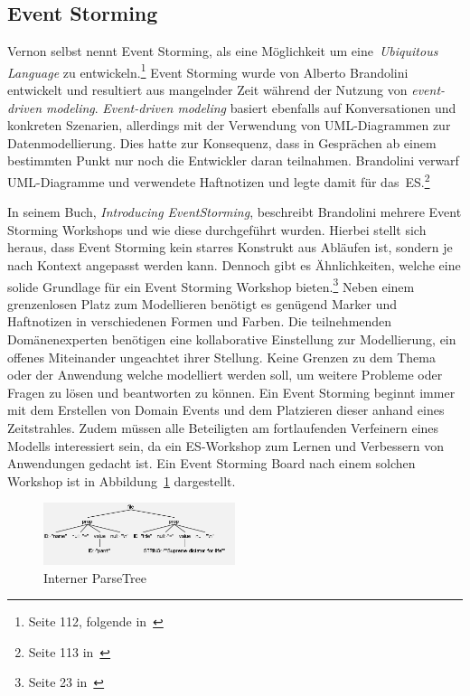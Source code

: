 \subsection{Event Storming}\label{subsec:allgemein}
Vernon selbst nennt Event Storming, als eine Möglichkeit um eine~\textit{Ubiquitous Language} zu entwickeln.\footnote{Seite 112, folgende in~\cite*{dddd}}
Event Storming wurde von Alberto Brandolini entwickelt und resultiert aus mangelnder Zeit während der Nutzung von \textit{event-driven modeling}.
\textit{Event-driven modeling} basiert ebenfalls auf Konversationen und konkreten Szenarien, allerdings mit der Verwendung von UML-Diagrammen zur Datenmodellierung.
Dies hatte zur Konsequenz, dass in Gesprächen ab einem bestimmten Punkt nur noch die Entwickler daran teilnahmen.
Brandolini verwarf UML-Diagramme und verwendete Haftnotizen und legte damit für das~\ac{ES}.\footnote{Seite 113 in~\cite*{dddd}}

In seinem Buch, \textit{Introducing EventStorming}, beschreibt Brandolini mehrere Event Storming Workshops und wie diese durchgeführt wurden.\cite*{introES}
Hierbei stellt sich heraus, dass Event Storming kein starres Konstrukt aus Abläufen ist, sondern je nach Kontext angepasst werden kann.
Dennoch gibt es Ähnlichkeiten, welche eine solide Grundlage für ein Event Storming Workshop bieten.\footnote{Seite 23 in~\cite*{introES}}
Neben einem grenzenlosen Platz zum Modellieren benötigt es genügend Marker und Haftnotizen in verschiedenen Formen und Farben.
Die teilnehmenden Domänenexperten benötigen eine kollaborative Einstellung zur Modellierung, ein offenes Miteinander ungeachtet ihrer Stellung.
Keine Grenzen zu dem Thema oder der Anwendung welche modelliert werden soll, um weitere Probleme oder Fragen zu lösen und beantworten zu können.
Ein Event Storming beginnt immer mit dem Erstellen von Domain Events und dem Platzieren dieser anhand eines Zeitstrahles.
Zudem müssen alle Beteiligten am fortlaufenden Verfeinern eines Modells interessiert sein, da ein \ac{ES}-Workshop zum Lernen und Verbessern
von Anwendungen gedacht ist.
Ein Event Storming Board nach einem solchen Workshop ist in Abbildung~\ref{fig:rlBoard} dargestellt.

\begin{figure}[h]
    \centering
    \includegraphics[width=0.5\textwidth]{images/2.2/parseTreeExample}
    \caption{Interner ParseTree}
    \label{fig:rlBoard}
\end{figure}

